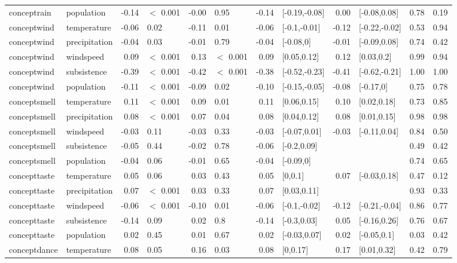 \begin{table}[ht]
\begin{tabular}{llrlrlrlrlrr}
  conceptrain & population & -0.14 & $<$ 0.001 & -0.00 & 0.95 & -0.14 & [-0.19,-0.08] & 0.00 & [-0.08,0.08] & 0.78 & 0.19 \\ 
  conceptwind & temperature & -0.06 & 0.02 & -0.11 & 0.01 & -0.06 & [-0.1,-0.01] & -0.12 & [-0.22,-0.02] & 0.53 & 0.94 \\ 
  conceptwind & precipitation & -0.04 & 0.03 & -0.01 & 0.79 & -0.04 & [-0.08,0] & -0.01 & [-0.09,0.08] & 0.74 & 0.42 \\ 
  conceptwind & windspeed & 0.09 & $<$ 0.001 & 0.13 & $<$ 0.001 & 0.09 & [0.05,0.12] & 0.12 & [0.03,0.2] & 0.99 & 0.94 \\ 
  conceptwind & subsistence & -0.39 & $<$ 0.001 & -0.42 & $<$ 0.001 & -0.38 & [-0.52,-0.23] & -0.41 & [-0.62,-0.21] & 1.00 & 1.00 \\ 
  conceptwind & population & -0.11 & $<$ 0.001 & -0.09 & 0.02 & -0.10 & [-0.15,-0.05] & -0.08 & [-0.17,0] & 0.75 & 0.78 \\ 
  conceptsmell & temperature & 0.11 & $<$ 0.001 & 0.09 & 0.01 & 0.11 & [0.06,0.15] & 0.10 & [0.02,0.18] & 0.73 & 0.85 \\ 
  conceptsmell & precipitation & 0.08 & $<$ 0.001 & 0.07 & 0.04 & 0.08 & [0.04,0.12] & 0.08 & [0.01,0.15] & 0.98 & 0.98 \\ 
  conceptsmell & windspeed & -0.03 & 0.11 & -0.03 & 0.33 & -0.03 & [-0.07,0.01] & -0.03 & [-0.11,0.04] & 0.84 & 0.50 \\ 
  conceptsmell & subsistence & -0.05 & 0.44 & -0.02 & 0.78 & -0.06 & [-0.2,0.09] &  &  & 0.49 & 0.42 \\ 
  conceptsmell & population & -0.04 & 0.06 & -0.01 & 0.65 & -0.04 & [-0.09,0] &  &  & 0.74 & 0.65 \\ 
  concepttaste & temperature & 0.05 & 0.06 & 0.03 & 0.43 & 0.05 & [0,0.1] & 0.07 & [-0.03,0.18] & 0.47 & 0.12 \\ 
  concepttaste & precipitation & 0.07 & $<$ 0.001 & 0.03 & 0.33 & 0.07 & [0.03,0.11] &  &  & 0.93 & 0.33 \\ 
  concepttaste & windspeed & -0.06 & $<$ 0.001 & -0.10 & 0.01 & -0.06 & [-0.1,-0.02] & -0.12 & [-0.21,-0.04] & 0.86 & 0.77 \\ 
  concepttaste & subsistence & -0.14 & 0.09 & 0.02 & 0.8 & -0.14 & [-0.3,0.03] & 0.05 & [-0.16,0.26] & 0.76 & 0.67 \\ 
  concepttaste & population & 0.02 & 0.45 & 0.01 & 0.67 & 0.02 & [-0.03,0.07] & 0.02 & [-0.05,0.1] & 0.03 & 0.42 \\ 
  conceptdance & temperature & 0.08 & 0.05 & 0.16 & 0.03 & 0.08 & [0,0.17] & 0.17 & [0.01,0.32] & 0.42 & 0.79 \\ 

\end{tabular}
\end{table}
